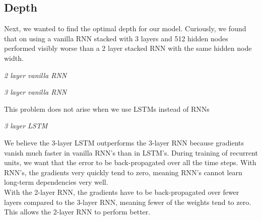 \documentclass{article} %
\begin{document}
\subsection*{Depth}
Next, we wanted to find the optimal depth for our model. Curiously, we found that on using a vanilla RNN stacked with 3 layers and 512 hidden nodes performed visibly worse than a 2 layer stacked RNN with the same hidden node width.

\emph{2 layer vanilla RNN}\\

\emph{3 layer vanilla RNN}\\

This problem does not arise when we use LSTMs instead of RNNs

\emph{3 layer LSTM}\\

We believe the 3-layer LSTM outperforms the 3-layer RNN because gradients vanish much faster in vanilla RNN's than in LSTM's. During training of recurrent units, we want that the error to be back-propagated over all the time steps. With RNN's, the gradients very quickly tend to zero, meaning RNN's cannot learn long-term dependencies very well.\\ With the 2-layer RNN, the gradients have to be back-propagated over fewer layers compared to the 3-layer RNN, meaning fewer of the weights tend to zero. This allows the 2-layer RNN to perform better.
\end{document}
